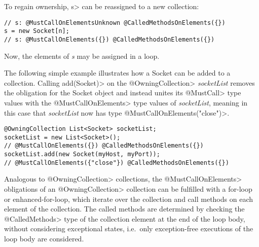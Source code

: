 To regain ownership, \<s> can be reassigned to a new collection:

\begin{verbatim}
// s: @MustCallOnElementsUnknown @CalledMethodsOnElements({})
s = new Socket[n];
// s: @MustCallOnElements({}) @CalledMethodsOnElements({})
\end{verbatim}

Now, the elements of \textit{s} may be assigned in a loop.



The following simple example illustrates how a Socket can be added to a collection. Calling \<add(Socket)> on the \<@OwningCollection> \textit{socketList} removes the obligation for the Socket object and instead unites its \<@MustCall> type values with the \<@MustCallOnElements> type values of \textit{socketList}, meaning in this case that \textit{socketList} now has type  \<@MustCallOnElements({"close"})>.

\begin{verbatim}
@OwningCollection List<Socket> socketList;
socketList = new List<Socket>();
// @MustCallOnElements({}) @CalledMethodsOnElements({})
socketList.add(new Socket(myHost, myPort));
// @MustCallOnElements({"close"}) @CalledMethodsOnElements({})
\end{verbatim}



Analogous to \<@OwningCollection> collections, the \<@MustCallOnElements> obligations of an \<@OwningCollection> collection can be fulfilled with a for-loop or enhanced-for-loop, which iterate over the collection and call methods on each element of the collection. The called methods are determined by checking the \<@CalledMethods> type of the collection element at the end of the loop body, without considering exceptional states, i.e.\ only exception-free executions of the loop body are considered.

